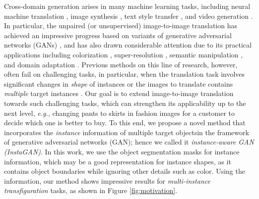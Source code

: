 \documentclass{article} \usepackage{iclr2019_conference,times}
\begin{document}
Cross-domain generation arises in many machine learning tasks,
including neural machine translation \citep{artetxe2017unsupervised, lample2017unsupervised},  image synthesis \citep{reed2016generative, zhu2016generative},
text style transfer \citep{shen2017style},
and video generation \citep{bansal2018recycle, wang2018video, chan2018everybody}.
In particular, the unpaired (or unsupervised) image-to-image translation has achieved an impressive progress based on variants of generative adversarial networks (GANs) 
\citep{zhu2017unpaired, liu2017unsupervised, choi2017stargan, almahairi2018augmented, huang2018multimodal, lee2018diverse}, and has also drawn considerable attention due to its practical applications including 
colorization \citep{zhang2016colorful}, super-resolution \citep{ledig2017photo}, semantic manipulation \citep{wang2018high},
and domain adaptation \citep{bousmalis2017unsupervised, shrivastava2017learning, hoffman2017cycada}.
Previous methods on this line of research, however, often fail on challenging tasks,
in particular, when the translation task involves significant changes in  \textit{shape} of instances  \citep{zhu2017unpaired}
or the images to translate contains \textit{multiple} target instances \citep{gokaslan2018improving}.
Our goal is to extend    image-to-image translation towards such challenging tasks,
which can strengthen its applicability up to the next level,
\textit{e.g.,} changing pants to skirts in fashion images for a customer to decide which one is better to buy.
To this end, we propose a novel method that incorporates the \textit{instance} information of multiple target objectsin the framework of generative adversarial networks (GAN);  hence we called it {\it instance-aware GAN (InstaGAN)}.
In this work, we use the object segmentation masks for instance information,
which may be a good representation for instance shapes, as it contains object boundaries while ignoring other details such as color.
Using the information, our method shows impressive results for
\textit{multi-instance transfiguration} tasks, as shown in Figure \ref{fig:motivation}.
\end{document}
